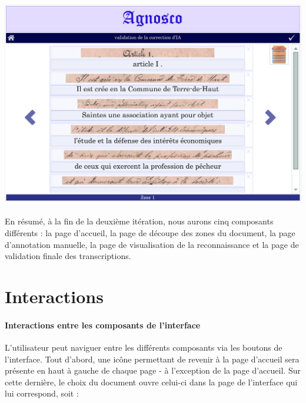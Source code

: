 \begin{mdframed}[frametitle={Figure 6 : Maquette de la page de validation finale lors de la deuxième itération}, innerbottommargin=10]
\begin{center}
\includegraphics[scale=0.04]{assets/maquetteIHMvalidationIA.jpg}
\end{center}
\end{mdframed}

\paragraph{}
En résumé, à la fin de la deuxième itération, nous aurons cinq composants différents : la page d’accueil, la page de découpe des zones du document, la page d’annotation manuelle, la page de visualisation de la reconnaissance et la page de validation finale des transcriptions.


\section{Interactions}

\paragraph{Interactions entre les composants de l'interface}
L’utilisateur peut naviguer entre les différents composants via les boutons de l’interface.
\newline{}
Tout d’abord, une icône permettant de revenir à la page d’accueil sera présente en haut à gauche de chaque page - à l’exception de la page d’accueil. Sur cette dernière, le choix du document ouvre celui-ci dans la page de l’interface qui lui correspond, soit :

